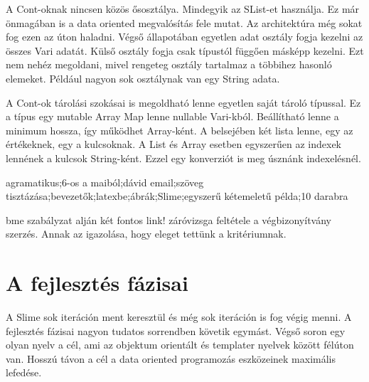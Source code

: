 {A Cont-oknak nincsen közös ősosztálya.
Mindegyik az SList-et használja.
Ez már önmagában is a data oriented megvalósítás fele mutat.
Az architektúra még sokat fog ezen az úton haladni.
Végső állapotában egyetlen adat osztály fogja kezelni az összes Vari adatát. 
Külső osztály fogja csak típustól függően másképp kezelni.
Ezt nem nehéz megoldani, mivel rengeteg osztály tartalmaz a többihez hasonló elemeket.
Például nagyon sok osztálynak van egy String adata.

A Cont-ok tárolási szokásai is megoldható lenne egyetlen saját tároló típussal.
Ez a típus egy mutable Array Map lenne nullable Vari-kból.
Beállítható lenne a minimum hossza, így működhet Array-ként.
A belsejében két lista lenne, egy az értékeknek, egy a kulcsoknak.
A List és Array esetben egyszerűen az indexek lennének a kulcsok String-ként.
Ezzel egy konverziót is meg úsznánk indexelésnél.

agramatikus;6-os a maiból;dávid email;szöveg tisztázása;bevezetők;latexbe;ábrák;Slime;egyszerű kétemeletű példa;10 darabra

bme szabályzat alján két fontos link!
záróvizsga feltétele a végbizonyítvány szerzés.
Annak az igazolása, hogy eleget tettünk a kritériumnak.




\section{A fejlesztés fázisai}
A Slime sok iteráción ment keresztül és még sok iteráción is fog végig menni. 
A fejlesztés fázisai nagyon tudatos sorrendben követik egymást.
Végső soron egy olyan nyelv a cél, ami az objektum orientált és templater nyelvek között félúton van.
Hosszú távon a cél a data oriented programozás eszközeinek maximális lefedése.

}
